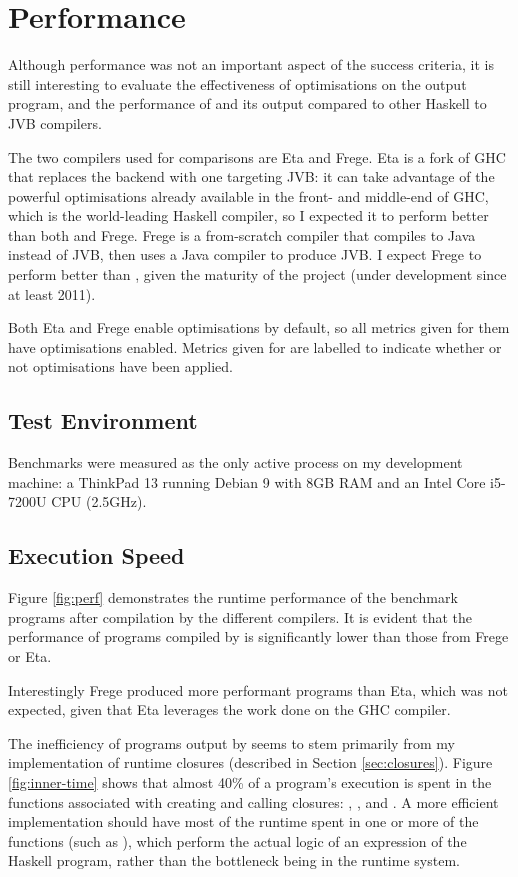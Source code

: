 \documentclass[dissertation.tex]{subfiles}
\begin{document}
\section{Performance}
{
    Although performance was not an important aspect of the success criteria, it is still interesting to evaluate the effectiveness of optimisations on the output program, and the performance of \compilername and its output compared to other Haskell to JVB compilers.

    The two compilers used for comparisons are Eta and Frege. Eta is a fork of GHC that replaces the backend with one targeting JVB: it can take advantage of the powerful optimisations already available in the front- and middle-end of GHC, which is the world-leading Haskell compiler, so I expected it to perform better than both \compilername and Frege. Frege is a from-scratch compiler that compiles to Java instead of JVB, then uses a Java compiler to produce JVB. I expect Frege to perform better than \compilername, given the maturity of the project (under development since at least 2011).

    Both Eta and Frege enable optimisations by default, so all metrics given for them have optimisations enabled. Metrics given for \compilername are labelled to indicate whether or not optimisations have been applied.

    \subsection{Test Environment}\label{sec:test-environment}
    {
        Benchmarks were measured as the only active process on my development machine: a ThinkPad 13 running Debian 9 with 8GB RAM and an Intel Core i5-7200U CPU (2.5GHz).
    }
    \subsection{Execution Speed}
    {
        Figure \ref{fig:perf} demonstrates the runtime performance of the benchmark programs after compilation by the different compilers. It is evident that the performance of programs compiled by \compilername is significantly lower than those from Frege or Eta.

        Interestingly Frege produced more performant programs than Eta, which was not expected, given that Eta leverages the work done on the GHC compiler.

        The inefficiency of programs output by \compilername seems to stem primarily from my implementation of runtime closures (described in Section \ref{sec:closures}). Figure \ref{fig:inner-time} shows that almost 40\% of a program's execution is spent in the functions associated with creating and calling closures: , , and . A more efficient implementation should have most of the runtime spent in one or more of the  functions (such as ), which perform the actual logic of an expression of the Haskell program, rather than the bottleneck being in the runtime system.

}}
\end{document}
